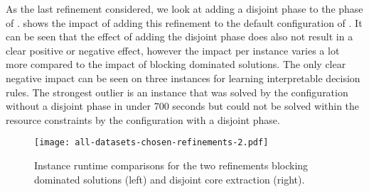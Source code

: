 As the last refinement considered, we look at adding a disjoint phase to the \msu{} phase of \msh{}.
 shows the impact of adding this refinement to the default configuration of \msh{}.
It can be seen that the effect of adding the disjoint phase does also not result in a clear positive or negative effect, however the impact per instance varies a lot more compared to the impact of blocking dominated solutions.
The only clear negative impact can be seen on three instances for learning interpretable decision rules.
The strongest outlier is an instance that was solved by the configuration without a disjoint phase in under 700 seconds but could not be solved within the resource constraints by the configuration with a disjoint phase.

\begin{figure}
    \centering
    \texttt{[image: all-datasets-chosen-refinements-2.pdf]}
    \caption{Instance runtime comparisons for the two refinements blocking dominated solutions (left) and disjoint core extraction (right).}\label{fig:refinements-2}
\end{figure}